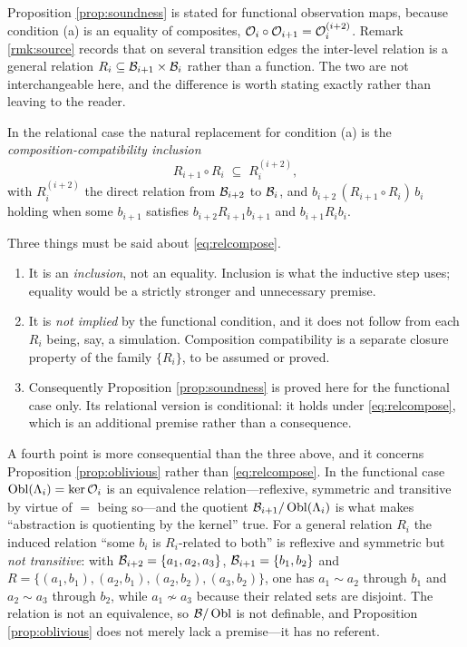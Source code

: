 \begin{remark}\label{rmk:relational-compose}
Proposition \ref{prop:soundness} is stated for functional observation maps, because condition (a)
is an equality of composites, $\mathcal{O}_i \circ \mathcal{O}_{i+1} = \mathcal{O}_i^{(i+2)}$. Remark \ref{rmk:source}
records that on several transition edges the inter-level relation is a general relation
$R_i \subseteq \mathcal{B}_{i+1} \times \mathcal{B}_i$ rather than a function. The two are not interchangeable
here, and the difference is worth stating exactly rather than leaving to the reader.

In the relational case the natural replacement for condition (a) is the
\emph{composition-compatibility inclusion}
\begin{equation}\label{eq:relcompose}
R_{i+1} \circ R_i \;\subseteq\; R_i^{(i+2)},
\end{equation}
with $R_i^{(i+2)}$ the direct relation from $\mathcal{B}_{i+2}$ to $\mathcal{B}_i$, and
$b_{i+2}\,(R_{i+1} \circ R_i)\,b_i$ holding when some $b_{i+1}$ satisfies
$b_{i+2} R_{i+1} b_{i+1}$ and $b_{i+1} R_i b_i$.

Three things must be said about \eqref{eq:relcompose}.
\begin{enumerate}[label=(\alph*)]
\item It is an \emph{inclusion}, not an equality. Inclusion is what the inductive step uses;
      equality would be a strictly stronger and unnecessary premise.
\item It is \emph{not implied} by the functional condition, and it does not follow from each $R_i$
      being, say, a simulation. Composition compatibility is a separate closure property of the
      family $\{R_i\}$, to be assumed or proved.
\item Consequently Proposition \ref{prop:soundness} is proved here for the functional case only.
      Its relational version is conditional: it holds under \eqref{eq:relcompose}, which is an
      additional premise rather than a consequence.
\end{enumerate}

A fourth point is more consequential than the three above, and it concerns
Proposition \ref{prop:oblivious} rather than \eqref{eq:relcompose}. In the functional case
$\operatorname{Obl}(\Lambda_i) = \ker\mathcal{O}_i$ is an equivalence relation---reflexive, symmetric and transitive by
virtue of $=$ being so---and the quotient $\mathcal{B}_{i+1}/\operatorname{Obl}(\Lambda_i)$ is what makes
``abstraction is quotienting by the kernel'' true. For a general relation $R_i$ the induced relation
``some $b_i$ is $R_i$-related to both'' is reflexive and symmetric but \emph{not transitive}: with
$\mathcal{B}_{i+2} = \{a_1,a_2,a_3\}$, $\mathcal{B}_{i+1} = \{b_1,b_2\}$ and
$R = \{(a_1,b_1),(a_2,b_1),(a_2,b_2),(a_3,b_2)\}$, one has $a_1 \sim a_2$ through $b_1$ and
$a_2 \sim a_3$ through $b_2$, while $a_1 \not\sim a_3$ because their related sets are disjoint. The
relation is not an equivalence, so $\mathcal{B}/\operatorname{Obl}$ is not definable, and
Proposition \ref{prop:oblivious} does not merely lack a premise---it has no referent.


\end{remark}

